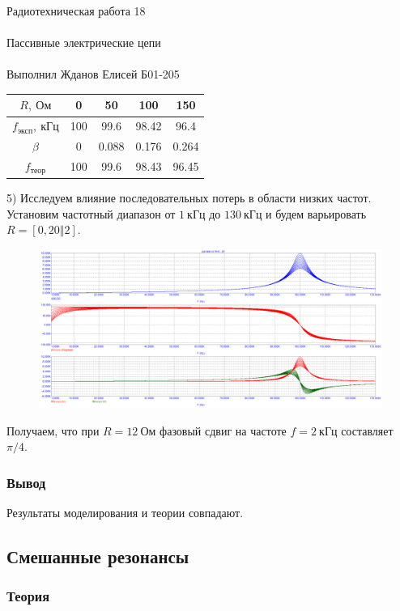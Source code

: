 \documentclass{astroedu-lab}
\begin{document}
\begin{problem}{\huge Радиотехническая работа 18\\\\Пассивные электрические цепи\\\\Выполнил Жданов Елисей Б01-205}
\begin{center}
\begin{tabular}{|c|c|c|c|c|}
\hline 
$R, \: \text{Ом}$ & 0 & 50 & 100 & 150 \\ 
\hline 
$f_{\text{эксп}}, \: \text{кГц}$ & 100 & 99.6 & 98.42 & 96.4 \\ 
\hline 
$\beta$ & 0 & 0.088 & 0.176 & 0.264 \\ 
\hline 
$f_{\text{теор}}$ & 100 & 99.6 & 98.43 & 96.45 \\ 
\hline 
\end{tabular} 
\end{center}

5) Исследуем влияние последовательных потерь в области низких частот. Установим частотный диапазон от $1 \: \text{кГц}$ до $130 \: \text{кГц}$ и будем варьировать $R = [0,20 \Vert 2]$.

\begin{figure}[h!]
\centering
\includegraphics[scale=0.4]{parallel_AC3.png}
\label{fig:Image1}
\end{figure} 

Получаем, что при $R = 12 \: \textit{Ом}$ фазовый сдвиг на частоте $f = 2 \: \textit{кГц}$ составляет $\pi / 4$. 

\subsubsection{Вывод}

Результаты моделирования и теории совпадают.

\subsection{Смешанные резонансы}

\subsubsection{Теория}


\end{problem}
\end{document}
